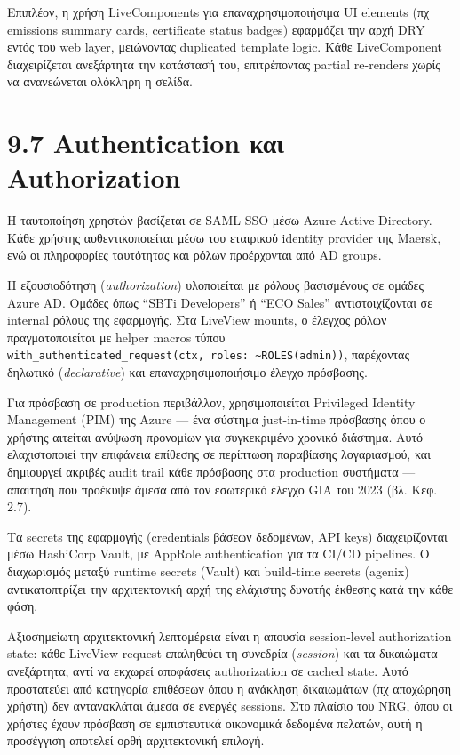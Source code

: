 Επιπλέον, η χρήση LiveComponents για επαναχρησιμοποιήσιμα UI elements
(πχ emissions summary cards, certificate status badges) εφαρμόζει την
αρχή DRY εντός του web layer, μειώνοντας duplicated template logic. Κάθε
LiveComponent διαχειρίζεται ανεξάρτητα την κατάστασή του, επιτρέποντας
partial re-renders χωρίς να ανανεώνεται ολόκληρη η σελίδα.

\section{9.7 Authentication και
Authorization}\label{authentication-ux3baux3b1ux3b9-authorization}

Η ταυτοποίηση χρηστών βασίζεται σε SAML SSO μέσω Azure Active Directory.
Κάθε χρήστης αυθεντικοποιείται μέσω του εταιρικού identity provider της
Maersk, ενώ οι πληροφορίες ταυτότητας και ρόλων προέρχονται από AD
groups.

Η εξουσιοδότηση (\emph{authorization}) υλοποιείται με ρόλους βασισμένους
σε ομάδες Azure AD. Ομάδες όπως ``SBTi Developers'' ή ``ECO Sales''
αντιστοιχίζονται σε internal ρόλους της εφαρμογής. Στα LiveView mounts,
ο έλεγχος ρόλων πραγματοποιείται με helper macros τύπου
\texttt{with\_authenticated\_request(ctx,\ roles:\ \textasciitilde{}ROLES(admin))},
παρέχοντας δηλωτικό (\emph{declarative}) και επαναχρησιμοποιήσιμο
έλεγχο πρόσβασης.

Για πρόσβαση σε production περιβάλλον, χρησιμοποιείται Privileged
Identity Management (PIM) της Azure --- ένα σύστημα just-in-time
πρόσβασης όπου ο χρήστης αιτείται ανύψωση προνομίων για συγκεκριμένο
χρονικό διάστημα. Αυτό ελαχιστοποιεί την επιφάνεια επίθεσης σε περίπτωση
παραβίασης λογαριασμού, και δημιουργεί ακριβές audit trail κάθε
πρόσβασης στα production συστήματα --- απαίτηση που προέκυψε άμεσα από
τον εσωτερικό έλεγχο GIA του 2023 (βλ. Κεφ. 2.7).

Τα secrets της εφαρμογής (credentials βάσεων δεδομένων, API keys)
διαχειρίζονται μέσω HashiCorp Vault, με AppRole authentication για τα
CI/CD pipelines. Ο διαχωρισμός μεταξύ runtime secrets (Vault) και
build-time secrets (agenix) αντικατοπτρίζει την αρχιτεκτονική αρχή της
ελάχιστης δυνατής έκθεσης κατά την κάθε φάση.

Αξιοσημείωτη αρχιτεκτονική λεπτομέρεια είναι η απουσία session-level
authorization state: κάθε LiveView request επαληθεύει τη συνεδρία
(\emph{session}) και τα δικαιώματα ανεξάρτητα, αντί να εκχωρεί αποφάσεις
authorization σε cached state. Αυτό προστατεύει από κατηγορία επιθέσεων
όπου η ανάκληση δικαιωμάτων (πχ αποχώρηση χρήστη) δεν αντανακλάται άμεσα
σε ενεργές sessions. Στο πλαίσιο του NRG, όπου οι χρήστες έχουν πρόσβαση
σε εμπιστευτικά οικονομικά δεδομένα πελατών, αυτή η προσέγγιση αποτελεί
ορθή αρχιτεκτονική επιλογή.

